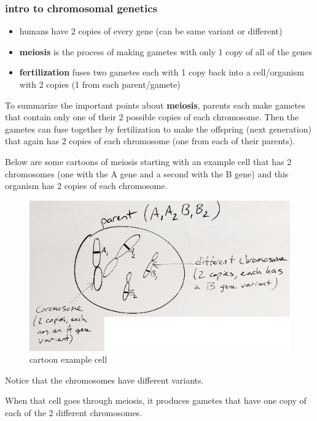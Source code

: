 \documentclass[]{book}
\providecommand{\tightlist}{%
  \setlength{\itemsep}{0pt}\setlength{\parskip}{0pt}}
\theoremstyle{definition}
\theoremstyle{definition}
\theoremstyle{definition}
\theoremstyle{remark}
\begin{document}
\subsubsection{intro to chromosomal
genetics}\label{intro-to-chromosomal-genetics}

\begin{itemize}
\tightlist
\item
  humans have 2 copies of every gene (can be same variant or different)
\item
  \textbf{meiosis} is the process of making gametes with only 1 copy of
  all of the genes
\item
  \textbf{fertilization} fuses two gametes each with 1 copy back into a
  cell/organism with 2 copies (1 from each parent/gamete)
\end{itemize}

To summarize the important points about \textbf{meiosis}, parents each
make gametes that contain only one of their 2 possible copies of each
chromosome. Then the gametes can fuse together by fertilization to make
the offspring (next generation) that again has 2 copies of each
chromosome (one from each of their parents).

Below are some cartoons of meiosis starting with an example cell that
has 2 chromosomes (one with the A gene and a second with the B gene) and
this organism has 2 copies of each chromosome.

\begin{figure}

{\centering \includegraphics[width=0.75\linewidth]{01-basics-figures/meiosis1} 

}

\caption{cartoon example cell}\label{fig:gen-fig-151}
\end{figure}

Notice that the chromosomes have different variants.

When that cell goes through meiosis, it produces gametes that have one
copy of each of the 2 different chromosomes.
\end{document}
